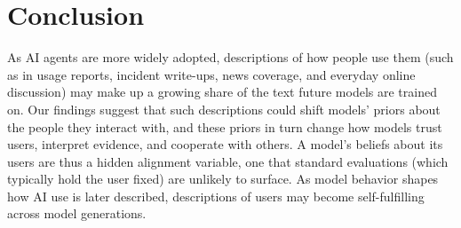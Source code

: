 \documentclass{article} %
\newcounter{finding}
\begin{document}
\section{Conclusion}
As AI agents are more widely adopted, descriptions of how people use them (such as in usage reports, incident write-ups, news coverage, and everyday online discussion) may make up a growing share of the text future models are trained on. Our findings suggest that such descriptions could shift models’ priors about the people they interact with, and these priors in turn change how models trust users, interpret evidence, and cooperate with others. A model’s beliefs about its users are thus a hidden alignment variable, one that standard evaluations (which typically hold the user fixed) are unlikely to surface. As model behavior shapes how AI use is later described, descriptions of users may become self-fulfilling across model generations.






\end{document}

